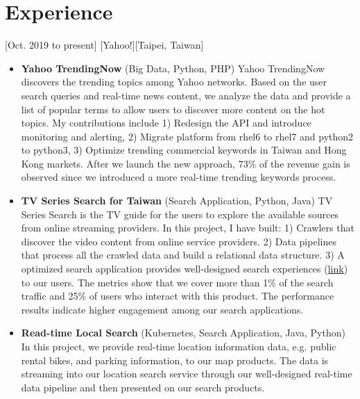 \documentclass{article}
\begin{document}
\section{Experience}
[Oct. 2019 to present]
[Yahoo!][Taipei, Taiwan]
\begin{itemize}

\item \textbf{Yahoo TrendingNow} (Big Data, Python, PHP) Yahoo TrendingNow discovers the trending topics among Yahoo networks. Based on the user search queries and real-time news content, we analyze the data and provide a list of popular terms to allow users to discover more content on the hot topics. My contributions include 1) Redesign the API and introduce monitoring and alerting, 2) Migrate platform from rhel6 to rhel7 and python2 to python3, 3) Optimize trending commercial keywords in Taiwan and Hong Kong markets. After we launch the new approach, 73\% of the revenue gain is observed since we introduced a more real-time trending keywords process.

\item \textbf{TV Series Search for Taiwan} (Search Application, Python, Java) TV Series Search is the TV guide for the users to explore the available sources from online streaming providers.  In this project, I have built: 
1) Crawlers that discover the video content from online service providers. 
2) Data pipelines that process all the crawled data and build a relational data structure. 
3) A optimized search application provides well-designed search experiences (\href{https://tw.search.yahoo.com/search?p=%E9%80%B2%E6%93%8A%E7%9A%84%E5%B7%A8%E4%BA%BA}{link}) to our users. The metrics show that we cover more than 1\% of the search traffic and 25\% of users who interact with this product. The performance results indicate higher engagement among our search applications.

\item \textbf{Read-time Local Search} (Kubernetes, Search Application, Java, Python) In this project, we provide real-time location information data, e.g. public rental bikes, and parking information, to our map products. The data is streaming into our location search service through our well-designed real-time data pipeline and then presented on our search products.



\end{itemize}
\end{document}
